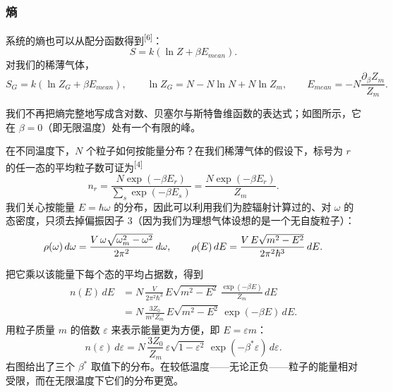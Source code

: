 \subsubsection{熵}

系统的熵也可以从配分函数得到\textsuperscript{[6]}：
\begin{equation}
S=k(\ln Z+\beta E_{mean}).
\end{equation}
对我们的稀薄气体，
\begin{equation}
S_{G}=k(\ln Z_{G}+\beta E_{mean}),\qquad
\ln Z_{G}=N-N\ln N+N\ln Z_{m},\qquad
E_{mean}=-N\frac{\partial_{\beta}Z_{m}}{Z_{m}}.
\end{equation}


我们不再把熵完整地写成含对数、贝塞尔与斯特鲁维函数的表达式；如图所示，它在 $\beta=0$（即无限温度）处有一个有限的峰。

在不同温度下，$N$ 个粒子如何按能量分布？在我们稀薄气体的假设下，标号为 $r$ 的任一态的平均粒子数可证为\textsuperscript{[4]}
\begin{equation}
n_{r}=\frac{N\exp(-\beta E_{r})}{\sum_{s}\exp(-\beta E_{s})}=\frac{N\exp(-\beta E_{r})}{Z_{m}}.
\end{equation}
我们关心按能量 $E=\hbar\omega$ 的分布，因此可以利用我们为腔辐射计算过的、对 $\omega$ 的态密度，只须去掉偏振因子 $3$（因为我们为理想气体设想的是一个无自旋粒子）：
\begin{equation}
\rho(\omega)\,d\omega=\frac{V\,\omega\sqrt{\omega_m^{2}-\omega^{2}}}{2\pi^{2}}\,d\omega,
\qquad
\rho(E)\,dE=\frac{V\,E\sqrt{m^{2}-E^{2}}}{2\pi^{2}\hbar^{3}}\,dE .
\end{equation}


把它乘以该能量下每个态的平均占据数，得到
\begin{align}
n(E)\,dE
&=N\,\frac{V}{2\pi^{2}\hbar^{3}}\,E\sqrt{m^{2}-E^{2}}\,\frac{\exp(-\beta E)}{Z_{m}}\,dE \nonumber\\
&=N\,\frac{3Z_{0}}{m^{3}Z_{m}}\,E\sqrt{m^{2}-E^{2}}\,\exp(-\beta E)\,dE .
\end{align}
用粒子质量 $m$ 的倍数 $\varepsilon$ 来表示能量更为方便，即 $E=\varepsilon m$：
\begin{equation}
n(\varepsilon)\,d\varepsilon
=N\,\frac{3Z_{0}}{Z_{m}}\,\varepsilon\sqrt{1-\varepsilon^{2}}\,\exp(-\beta^{*}\varepsilon)\,d\varepsilon .
\end{equation}
右图给出了三个 $\beta^{*}$ 取值下的分布。在较低温度——无论正负——粒子的能量相对受限，而在无限温度下它们的分布更宽。

